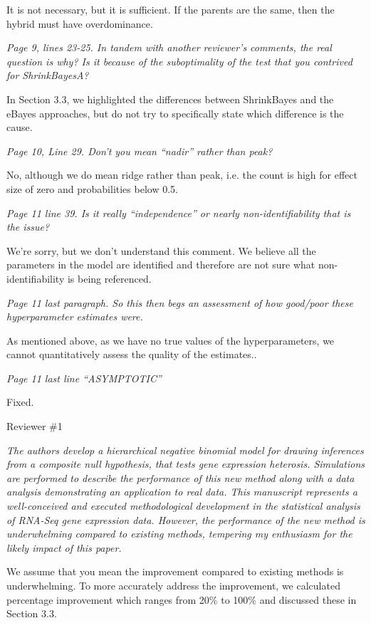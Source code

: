 \documentclass{article}
\newcommand{\comment}[1]{\textit{#1}}
\newcommand{\response}[1]{#1}
\begin{document}
{\response{It is not necessary, but it is sufficient. If the parents are the same, then the hybrid must have overdominance.}

\comment{Page 9, lines 23-25.  In tandem with another reviewer’s comments, the real question is why?  Is it because of the suboptimality of the test that you contrived for ShrinkBayesA?}

\response{In Section 3.3, we highlighted the differences between ShrinkBayes and the eBayes approaches, but do not try to specifically state which difference is the cause.}

\comment{Page 10, Line 29.  Don’t you mean “nadir” rather than peak?}

\response{No, although we do mean ridge rather than peak, i.e. the count is high for effect size of zero and probabilities below 0.5.}

\comment{Page 11 line 39.  Is it really “independence” or nearly non-identifiability that is the issue?}

\response{We're sorry, but we don't understand this comment. We believe all the parameters in the model are identified and therefore are not sure what non-identifiability is being referenced.}

\comment{Page 11 last paragraph.  So this then begs an assessment of how good/poor these hyperparameter estimates were.}

\response{As mentioned above, as we have no true values of the hyperparameters, we cannot quantitatively assess the quality of the estimates..}

\comment{Page 11 last line “ASYMPTOTIC”}}

\response{Fixed.}

Reviewer \#1

\comment{The authors develop a hierarchical negative binomial model for drawing inferences from a composite null hypothesis, that tests gene expression heterosis. Simulations are performed to describe the performance of this new method along with a data analysis demonstrating an application to real data. This manuscript represents a well-conceived and executed methodological development in the statistical analysis of RNA-Seq gene expression data. However, the performance of the new method is underwhelming compared to existing methods, tempering my enthusiasm for the likely impact of this paper.}

\response{We assume that you mean the improvement compared to existing methods is underwhelming. To more accurately address the improvement, we calculated percentage improvement which ranges from 20\% to 100\% and discussed these in Section 3.3.}
\end{document}

